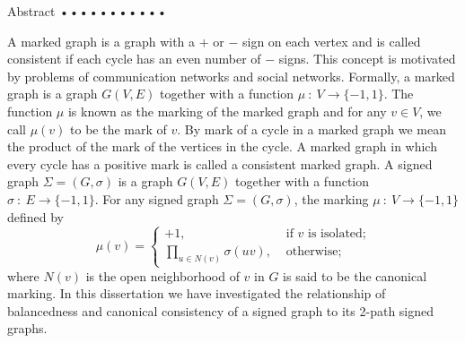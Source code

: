 \begin{preface}{\sf Abstract}
\baselineskip=18pt•••••••••••

A marked graph is a graph with a $+$ or $-$ sign on each vertex and is called consistent if each cycle has an even number of $−$ 
signs. This concept is motivated by problems of communication networks and social networks. Formally, a marked graph is a graph 
$G(V,E)$ together with a function $\mu~:~V\rightarrow\{-1,1\}$. The function $\mu$ is known as the 
marking of the marked graph and for any $v\in V$, we call $\mu(v)$ to be the mark of $v$. By mark of a cycle in a marked graph we 
mean the product of the mark of the vertices in the cycle. A marked graph in which every cycle has a positive mark is called a 
consistent marked graph.
A signed graph $\Sigma=(G,\sigma)$ is a graph $G(V,E)$ together with a function $\sigma 
~:~E\rightarrow\{-1,1\}$. For any signed graph $\Sigma=(G,\sigma)$,
the marking $\mu~:~V\rightarrow\{-1,1\}$ defined by 
$$\mu (v)=\begin{cases}
+1, & \text{ if $v$ is isolated;} \\
\prod\limits_{u\in N(v)}\sigma(uv), & \text{ otherwise;} 
\end{cases}
$$
  where $N(v)$ is the open neighborhood of $v$ in $G$ is said to be the canonical marking.  In this 
dissertation we have  investigated the relationship of balancedness and canonical consistency of a signed 
graph to its 2-path signed graphs.

\vspace{1.5cm}

\end{preface} %
